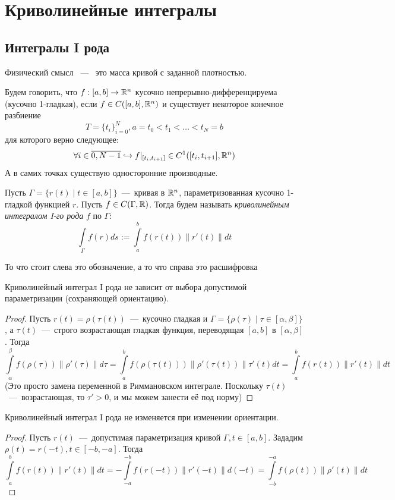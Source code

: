 \section{Криволинейные интегралы}
\subsection{Интегралы I рода}
Физический смысл ~---~ это масса кривой с заданной плотностью.
\begin{definition}
    Будем говорить, что $f: [a, b] \rightarrow \mathbb{R}^n$ кусочно непрерывно-дифференцируема (кусочно 1-гладкая), если $f \in C([a, b], \mathbb{R}^n)$ и существует некоторое конечное разбиение \[T = \{t_i\}_{i = 0}^N, a = t_0 < t_1 < \ldots < t_N = b\] для которого верно следующее: \[\forall i \in \overline{0, N - 1} \hookrightarrow f|_{[t_{i}, t_{i + 1}]} \in C^1([t_i, t_{i + 1}], \mathbb{R}^n)\]
    А в самих точках существую односторонние производные.
\end{definition}
\begin{definition}
    Пусть $\Gamma = \{r(t) \mid t \in [a, b]\}$~---~кривая в $\mathbb{R}^n$, параметризованная кусочно 1-гладкой функцией $r$. Пусть $f \in C(\Gamma, \mathbb{R})$. Тогда будем называть \textit{криволинейным интегралом I-го рода} $f$ по $\Gamma$:
    \[\int\limits_\Gamma f(r)ds := \int\limits_a^b f(r(t))\|r'(t)\|dt\]
\end{definition}
\begin{note}
    То что стоит слева это обозначение, а то что справа это расшифровка
\end{note}
\begin{lemma}
    Криволинейный интеграл I рода не зависит от выбора допустимой параметризации (сохраняющей ориентацию).
\end{lemma}
\begin{proof}
    Пусть $r(t) = \rho(\tau(t)) $~---~кусочно гладкая и $\Gamma = \{\rho(\tau) \mid \tau \in [\alpha, \beta]\}$, а $\tau(t)$~---~строго возрастающая гладкая функция, переводящая $[a, b]$ в $[\alpha, \beta]$. Тогда \[\int\limits_\alpha^\beta f(\rho(\tau))\|\rho'(\tau)\|d\tau = \int\limits_a^b f(\rho(\tau(t)))\|\rho'(\tau(t))\|\tau'(t)dt = \int\limits_a^b f(r(t))\|r'(t)\|dt\]
    (Это просто замена переменной в Риммановском интеграле. Поскольку $\tau(t)$~---~возрастающая, то $\tau' > 0$, и мы можем занести её под норму)
\end{proof}
\begin{lemma}
    Криволинейный интеграл I рода не изменяется при изменении ориентации.
\end{lemma}
\begin{proof}
    Пусть $r(t)$~---~допустимая параметризация кривой $\Gamma, t \in [a, b]$. Зададим $\rho(t) = r(-t), t \in [-b, -a]$. Тогда \[\int\limits_a^b f(r(t))\|r'(t)\|dt = -\int\limits_{-a}^{-b}f(r(-t)) \|r'(-t)\|d(-t) = \int\limits_{-b}^{-a}f(\rho(t))\|\rho'(t)\|dt\]
\end{proof}
